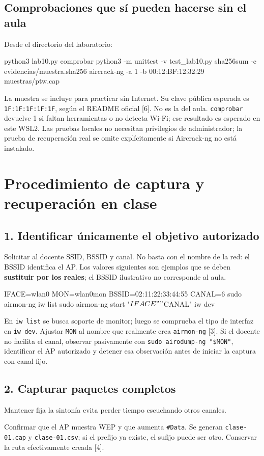 \documentclass[11pt,a4paper]{article}
\begin{document}
\subsection*{Comprobaciones que sí pueden hacerse sin el aula}
Desde el directorio del laboratorio:
\begin{comandos}
python3 lab10.py comprobar
python3 -m unittest -v test_lab10.py
sha256sum -c evidencias/muestra.sha256
aircrack-ng -a 1 -b 00:12:BF:12:32:29 muestras/ptw.cap
\end{comandos}
La muestra se incluye para practicar sin Internet. Su clave pública esperada
es \texttt{1F:1F:1F:1F:1F}, según el README oficial [6]. No es la del aula.
\texttt{comprobar} devuelve 1 si faltan herramientas o no detecta Wi-Fi; ese
resultado es esperado en este WSL2. Las pruebas locales no necesitan privilegios
de administrador; la prueba de recuperación real se omite explícitamente si
Aircrack-ng no está instalado.

\newpage
\section{Procedimiento de captura y recuperación en clase}
\subsection*{1. Identificar únicamente el objetivo autorizado}
Solicitar al docente SSID, BSSID y canal. No basta con el nombre de la red: el
BSSID identifica el AP. Los valores siguientes son ejemplos que se deben
\textbf{sustituir por los reales}; el BSSID ilustrativo no corresponde al aula.
\begin{comandos}
IFACE=wlan0
MON=wlan0mon
BSSID=02:11:22:33:44:55
CANAL=6
sudo airmon-ng
iw list
sudo airmon-ng start "$IFACE" "$CANAL"
iw dev
\end{comandos}
En \texttt{iw list} se busca soporte de monitor; luego se comprueba el tipo de
interfaz en \texttt{iw dev}. Ajustar \texttt{MON} al nombre que realmente crea
\texttt{airmon-ng} [3]. Si el docente no facilita el canal, observar pasivamente
con \texttt{sudo airodump-ng "\$MON"}, identificar el AP autorizado y detener
esa observación antes de iniciar la captura con canal fijo.

\subsection*{2. Capturar paquetes completos}
Mantener fija la sintonía evita perder tiempo escuchando otros canales.
Confirmar que el AP muestra WEP y que aumenta \texttt{\#Data}. Se generan
\texttt{clase-01.cap} y \texttt{clase-01.csv}; si el prefijo ya existe, el
sufijo puede ser otro. Conservar la ruta efectivamente creada [4].
\end{document}
